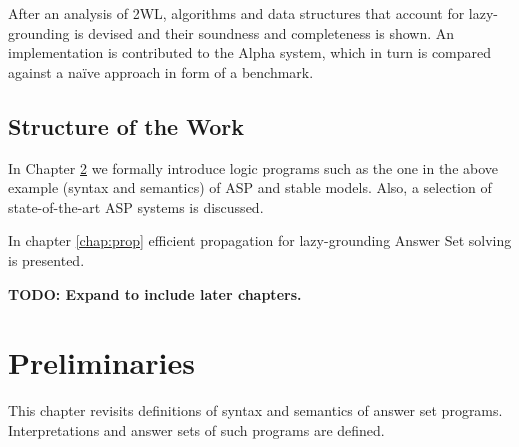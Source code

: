 \documentclass{vutinfth} %
\newcommand{\todo}[1]{{\color{red}\textbf{TODO: {#1}}}} %
\begin{document}



After an analysis of 2WL, algorithms and data structures that account for lazy-grounding is devised and their soundness and completeness is shown. An implementation is contributed to the Alpha system, which in turn is compared against a na{\"i}ve approach in form of a benchmark.

\section{Structure of the Work} %

In Chapter \ref{chap:prelim} we formally introduce logic programs such as the one in the above example (syntax and semantics) of ASP and stable models. Also, a selection of state-of-the-art ASP systems is discussed.

In chapter \ref{chap:prop} efficient propagation for lazy-grounding Answer Set solving is presented.

\todo{Expand to include later chapters.}

\chapter{Preliminaries}
\label{chap:prelim}

This chapter revisits definitions of syntax and semantics of answer set programs. Interpretations and answer sets of such programs are defined.
\end{document}
